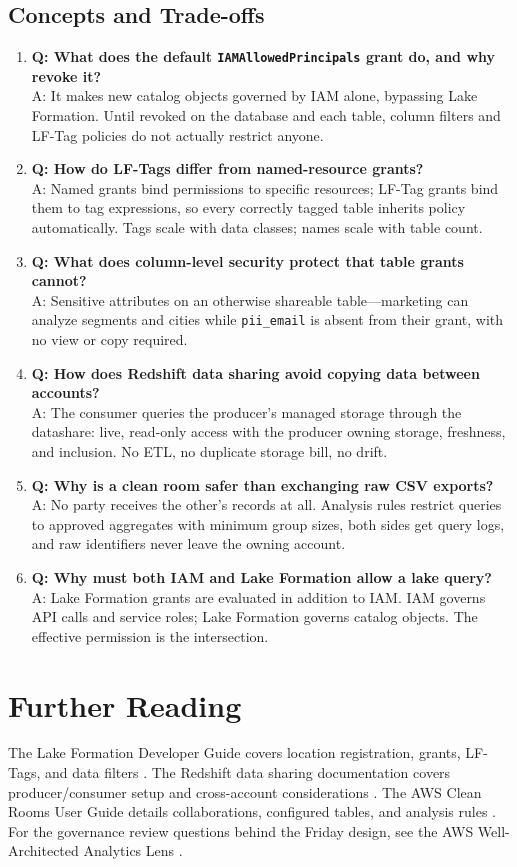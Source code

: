 \subsection{Concepts and Trade-offs}
\begin{enumerate}
    \item \textbf{Q: What does the default \texttt{IAMAllowedPrincipals} grant do, and why revoke it?}\\
    A: It makes new catalog objects governed by IAM alone, bypassing Lake Formation. Until revoked on the database and each table, column filters and LF-Tag policies do not actually restrict anyone.
    \item \textbf{Q: How do LF-Tags differ from named-resource grants?}\\
    A: Named grants bind permissions to specific resources; LF-Tag grants bind them to tag expressions, so every correctly tagged table inherits policy automatically. Tags scale with data classes; names scale with table count.
    \item \textbf{Q: What does column-level security protect that table grants cannot?}\\
    A: Sensitive attributes on an otherwise shareable table---marketing can analyze segments and cities while \texttt{pii\_email} is absent from their grant, with no view or copy required.
    \item \textbf{Q: How does Redshift data sharing avoid copying data between accounts?}\\
    A: The consumer queries the producer's managed storage through the datashare: live, read-only access with the producer owning storage, freshness, and inclusion. No ETL, no duplicate storage bill, no drift.
    \item \textbf{Q: Why is a clean room safer than exchanging raw CSV exports?}\\
    A: No party receives the other's records at all. Analysis rules restrict queries to approved aggregates with minimum group sizes, both sides get query logs, and raw identifiers never leave the owning account.
    \item \textbf{Q: Why must both IAM and Lake Formation allow a lake query?}\\
    A: Lake Formation grants are evaluated in addition to IAM. IAM governs API calls and service roles; Lake Formation governs catalog objects. The effective permission is the intersection.
\end{enumerate}

\section{Further Reading}
The Lake Formation Developer Guide covers location registration, grants, LF-Tags, and data filters \cite{awsLakeFormationDocs}. The Redshift data sharing documentation covers producer/consumer setup and cross-account considerations \cite{awsRedshiftDataSharing}. The AWS Clean Rooms User Guide details collaborations, configured tables, and analysis rules \cite{awsCleanRoomsDocs}. For the governance review questions behind the Friday design, see the AWS Well-Architected Analytics Lens \cite{awsWellArchitectedAnalytics}.

